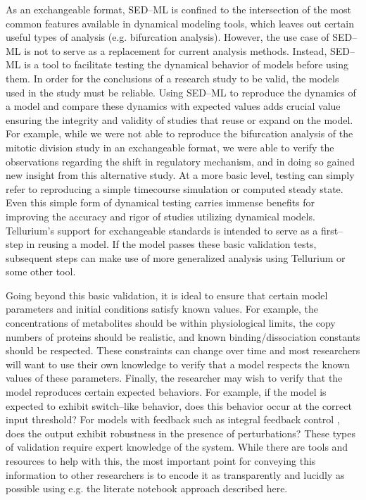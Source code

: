 \documentclass[10pt,letterpaper]{article}
\begin{document}
As an exchangeable format, SED--ML is confined to the intersection of the most common features available in dynamical modeling tools, which leaves out certain useful types of analysis (e.g. bifurcation analysis). However, the use case of SED--ML is not to serve as a replacement for current analysis methods. Instead, SED--ML is a tool to facilitate testing the dynamical behavior of models before using them. In order for the conclusions of a research study to be valid, the models used in the study must be reliable. Using SED--ML to reproduce the dynamics of a model and compare these dynamics with expected values adds crucial value ensuring the integrity and validity of studies that reuse or expand on the model. For example, while we were not able to reproduce the bifurcation analysis of the mitotic division study \cite{calzone2007dynamical} in an exchangeable format, we were able to verify the observations regarding the shift in regulatory mechanism, and in doing so gained new insight from this alternative study. At a more basic level, testing can simply refer to reproducing a simple timecourse simulation or computed steady state.
Even this simple form of dynamical testing carries immense benefits for improving the accuracy and rigor of studies utilizing dynamical models. Tellurium's support for exchangeable standards is intended to serve as a first--step in reusing a model. If the model passes these basic validation tests, subsequent steps can make use of more generalized analysis using Tellurium or some other tool.

Going beyond this basic validation, it is ideal to ensure that certain model parameters and initial conditions satisfy known values. For example, the concentrations of metabolites should be within physiological limits, the copy numbers of proteins should be realistic, and known binding/dissociation constants should be respected. These constraints can change over time and most researchers will want to use their own knowledge to verify that a model respects the known values of these parameters. Finally, the researcher may wish to verify that the model reproduces certain expected behaviors. For example, if the model is expected to exhibit switch--like behavior, does this behavior occur at the correct input threshold? For models with feedback such as integral feedback control \cite{briat2016antithetic}, does the output exhibit robustness in the presence of perturbations? These types of validation require expert knowledge of the system. While there are tools and resources to help with this, the most important point for conveying this information to other researchers is to encode it as transparently and lucidly as possible using e.g. the literate notebook approach described here.
\end{document}
